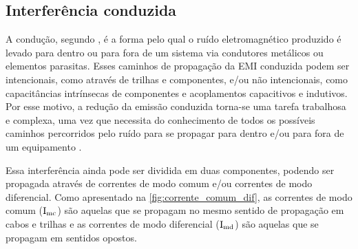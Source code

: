         
        
        
        
        
        \subsection{Interferência conduzida} \label{cap:fund_emc_intcond}
        
        A condução, segundo , é a forma pelo qual o ruído eletromagnético produzido é levado para dentro ou para fora de um sistema via condutores metálicos ou elementos parasitas. Esses caminhos de propagação da EMI conduzida podem ser intencionais, como através de trilhas e componentes, e/ou não intencionais, como capacitâncias intrínsecas de componentes e acoplamentos capacitivos e indutivos. Por esse motivo, a redução da emissão conduzida torna-se uma tarefa trabalhosa e complexa, uma vez que necessita do conhecimento de todos os possíveis caminhos percorridos pelo ruído para se propagar para dentro e/ou para fora de um equipamento \cite{ref:EMC_phd_schlichting}. 
        
        Essa interferência ainda pode ser dividida em duas componentes, podendo ser propagada através de correntes de modo comum e/ou correntes de modo diferencial.
        Como apresentado na \autoref{fig:corrente_comum_dif}, as correntes de modo comum ($\text{I}_\text{mc}$) são aquelas que se propagam no mesmo sentido de propagação em cabos e trilhas e as correntes de modo diferencial ($\text{I}_\text{md}$) são aquelas que se propagam em sentidos opostos. 
        
